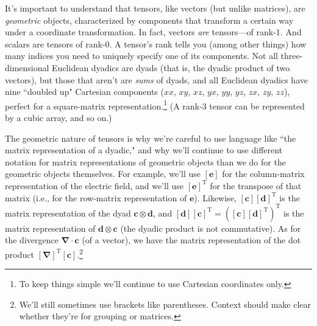 \documentclass[12pt]{article}
\renewcommand{\vv}[1]{\mathbf{#1}}
\newcommand{\del}{\boldsymbol{\nabla}}
\begin{document}
It's important to understand that tensors, like vectors (but unlike matrices), are \emph{geometric} objects, characterized by components that transform a certain way under a coordinate transformation. In fact, vectors \emph{are} tensors---of rank-1. And scalars are tensors of rank-0. A tensor's rank tells you (among other things) how many indices you need to uniquely specify one of its components. Not all three-dimensional Euclidean dyadics are dyads (that is, the dyadic product of two vectors), but those that aren't are \emph{sums} of dyads, and all Euclidean dyadics have nine ``doubled up" Cartesian components ($xx$, $xy$, $xz$, $yx$, $yy$, $yz$, $zx$, $zy$, $zz$), perfect for a square-matrix representation.\footnote{To keep things simple we'll continue to use Cartesian coordinates only.} (A rank-3 tensor can be represented by a cubic array, and so on.)

The geometric nature of tensors is why we're careful to use language like ``the matrix representation of a dyadic," and why we'll continue to use different notation for matrix representations of geometric objects than we do for the geometric objects themselves. For example, we'll use $[\vv e]$ for the column-matrix representation of the electric field, and we'll use $[\vv e]^{\textrm{T}}$ for the transpose of that matrix (i.e., for the row-matrix representation of $\vv e$). Likewise, $[\vv c][\vv d]^{\textrm{T}}$ is the matrix representation of the dyad $\vv c \otimes \vv d$, and ${[\vv d][\vv c]^{\textrm{T}} = ([\vv c][\vv d]^{\textrm{T}})^{\textrm{T}}}$ is the matrix representation of $\vv d \otimes \vv c$ (the dyadic product is not commutative). As for the divergence $\del \cdot \vv c$ (of a vector), we have the matrix representation of the dot product $[\del]^{\textrm{T}}[\vv c]$.\footnote{We'll still sometimes use brackets like parentheses. Context should make clear whether they're for grouping or matrices.}
\end{document}
